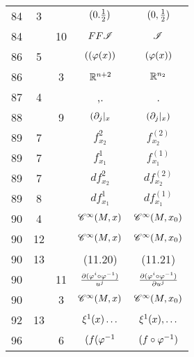 \documentclass[a4paper,11pt]{article}
\begin{document}
\begin{center}
\begin{tabular}{|c|c|c|c|c|}
    84  &  3 & & $( 0. \frac{ 1 }{ 2 } )$ & $( 0, \frac{ 1 }{ 2 } )$ \\
    84  & & 10 & $FF\mathcal{I}$ & $\mathcal{I}$ \\
    86  &  5 & & $( ( \varphi( x ) )$ & $( \varphi( x ) )$ \\
    86  & &  3 & $\mathbb{R}^{ n + 2 }$ & $\mathbb{R}^{ n_{ 2 } }$ \\
    87  &  4 & & ,. & . \\
    88  & &  9 & $( \partial_{ j }|_{ x }$ & $( \partial_{ j }|_{ x } )$ \\
    89  &  7 & & $f_{ x_{ 2 } }^{ 2 }$ & $f_{ x_{ 2 } }^{ ( 2 ) }$ \\
    89  &  7 & & $f_{ x_{ 1 } }^{ 1 }$ & $f_{ x_{ 1 } }^{ ( 1 ) }$ \\
    89  &  7 & & $d f_{ x_{ 2 } }^{ 2 }$ & $d f_{ x_{ 2 } }^{ ( 2 ) }$ \\
    89  &  8 & & $d f_{ x_{ 1 } }^{ 1 }$ & $d f_{ x_{ 1 } }^{ ( 1 ) }$ \\
    90  &  4 & & $\mathcal{C}^{ \infty }( M, x )$ & $\mathcal{C}^{ \infty }( M, x_{ 0 } )$ \\
    90  & 12 & & $\mathcal{C}^{ \infty }( M, x )$
           & $\mathcal{C}^{ \infty }( M, x_{ 0 } )$ \\
    90  & 13 & & (11.20) & (11.21) \\
    90  & & 11 & $\frac{ \partial ( \varphi^{ i } \circ \varphi^{ -1 } ) }{ u^{ j } }$
           & $\frac{ \partial ( \varphi^{ i } \circ \varphi^{ -1 } ) }{ \partial u^{ j } }$ \\
    90  & &  3 & $\mathcal{C}^{ \infty }( M, x )$
           & $\mathcal{C}^{ \infty }( M, x_{ 0 } )$ \\
    92  & 13 & & $\xi^{ 1 }(x) \ldots$ & $\xi^{ 1 }(x), \ldots$ \\
    96  & &  6 & $( f ( \varphi^{ -1 }$ & $( f \circ \varphi^{ -1 } )$ \\ 
    \hline
  \end{tabular}



\end{center}
\end{document}
